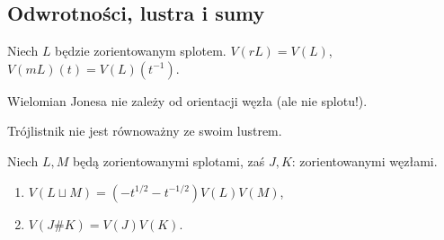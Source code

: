 \subsection{Odwrotności, lustra i sumy}

\begin{twierdzenie}
Niech $L$ będzie zorientowanym splotem.
$V(rL)=V(L)$, $V(mL)(t)=V(L)(t^{-1})$.
\end{twierdzenie}

\begin{wniosek}
Wielomian Jonesa nie zależy od orientacji węzła (ale nie splotu!).
\end{wniosek}

\begin{wniosek}
Trójlistnik nie jest równoważny ze swoim lustrem.
\end{wniosek}

\begin{twierdzenie}
Niech $L, M$ będą zorientowanymi splotami, zaś $J, K$: zorientowanymi węzłami.
\begin{enumerate}
\item $V(L \sqcup M) = (-t^{1/2} - t^{-1/2}) V(L) V(M)$,
\item $V(J \# K) = V(J) V(K)$.
\end{enumerate}
\end{twierdzenie}